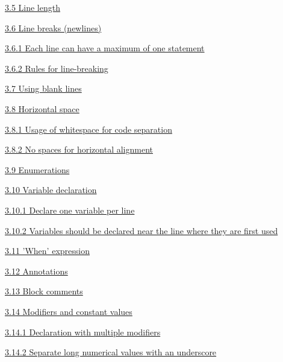 \hspace{0.5cm}\hyperref[sec:3.5]{ 3.5 Line length}

\hspace{0.5cm}\hyperref[sec:3.6]{ 3.6 Line breaks (newlines)}

\hspace{1.0cm}\hyperref[sec:3.6.1]{ 3.6.1 Each line can have a maximum of one statement}

\hspace{1.0cm}\hyperref[sec:3.6.2]{ 3.6.2 Rules for line-breaking}

\hspace{0.5cm}\hyperref[sec:3.7]{ 3.7 Using blank lines}

\hspace{0.5cm}\hyperref[sec:3.8]{ 3.8 Horizontal space}

\hspace{1.0cm}\hyperref[sec:3.8.1]{ 3.8.1 Usage of whitespace for code separation}

\hspace{1.0cm}\hyperref[sec:3.8.2]{ 3.8.2 No spaces for horizontal alignment}

\hspace{0.5cm}\hyperref[sec:3.9]{ 3.9 Enumerations}

\hspace{0.5cm}\hyperref[sec:3.10]{ 3.10 Variable declaration}

\hspace{1.0cm}\hyperref[sec:3.10.1]{ 3.10.1 Declare one variable per line}

\hspace{1.0cm}\hyperref[sec:3.10.2]{ 3.10.2 Variables should be declared near the line where they are first used}

\hspace{0.5cm}\hyperref[sec:3.11]{ 3.11 'When' expression}

\hspace{0.5cm}\hyperref[sec:3.12]{ 3.12 Annotations}

\hspace{0.5cm}\hyperref[sec:3.13]{ 3.13 Block comments}

\hspace{0.5cm}\hyperref[sec:3.14]{ 3.14 Modifiers and constant values}

\hspace{1.0cm}\hyperref[sec:3.14.1]{ 3.14.1 Declaration with multiple modifiers}

\hspace{1.0cm}\hyperref[sec:3.14.2]{ 3.14.2 Separate long numerical values with an underscore}

